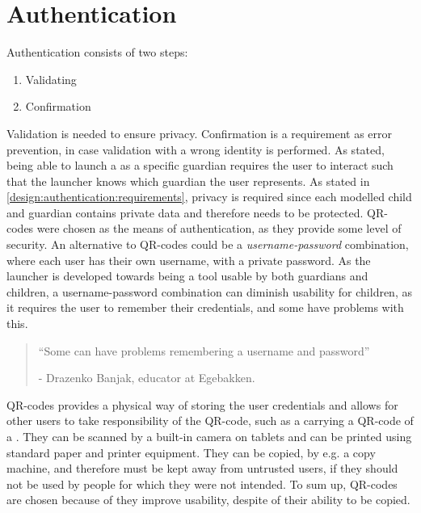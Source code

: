 \section{Authentication}
\label{design:authentication}
\label{design:authentication:requirements}
\label{design:authentication:solution}

\noindent Authentication consists of two steps:
\begin{enumerate}
	\item Validating
	\item Confirmation
\end{enumerate}
Validation is needed to ensure privacy. Confirmation is a requirement as error prevention, in case validation with a wrong identity is performed.
As stated, being able to launch a \girafapp[] as a specific guardian requires the user to interact such that the launcher knows which guardian the user represents.
As stated in \autoref{design:authentication:requirements}, privacy is required since each modelled child and guardian contains private data and therefore needs to be protected.
QR-codes were chosen as the means of authentication, as they provide some level of security.
An alternative to QR-codes could be a \emph{username-password} combination, where each user has their own username, with a private password.
As the launcher is developed towards being a tool usable by both guardians and children, a username-password combination can diminish usability for children, as it requires the user to remember their credentials, and some \autists[] have problems with this.

\begin{quotation}
``Some \autists[] can have problems remembering a username and password''\\ 
	\begin{flushright}
		- Drazenko Banjak, educator at Egebakken.
	\end{flushright}
\end{quotation}

QR-codes provides a physical way of storing the user credentials and allows for other users to take responsibility of the QR-code, such as a \guardian[] carrying a QR-code of a \autist[].
They can be scanned by a built-in camera on tablets and can be printed using standard paper and printer equipment. 
They can be copied, by e.g. a copy machine, and therefore must be kept away from untrusted users, if they should not be used by people for which they were not intended.
To sum up, QR-codes are chosen because of they improve usability, despite of their ability to be copied.  \\

